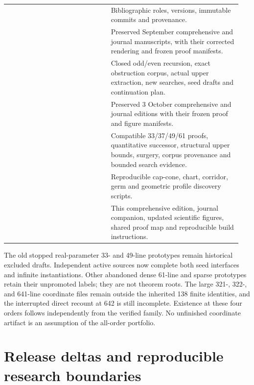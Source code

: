 \begin{longtable}{@{}P{0.42\linewidth}P{0.53\linewidth}@{}}
 & Bibliographic roles, versions, immutable commits and provenance.\\
 & Preserved September comprehensive and journal manuscripts, with their corrected rendering and frozen proof manifests.\\
 & Closed odd/even recursion, exact obstruction corpus, actual upper extraction, new searches, seed drafts and continuation plan.\\
 & Preserved 3 October comprehensive and journal editions with their frozen proof and figure manifests.\\
 & Compatible 33/37/49/61 proofs, quantitative successor, structural upper bounds, surgery, corpus provenance and bounded search evidence.\\
 & Reproducible cap-cone, chart, corridor, germ and geometric profile discovery scripts.\\
 & This comprehensive edition, journal companion, updated scientific figures, shared proof map and reproducible build instructions.\\
\end{longtable}

The old stopped real-parameter 33- and 49-line prototypes remain
historical excluded drafts. Independent active sources now complete
both seed interfaces and infinite instantiations. Other abandoned dense
61-line and sparse prototypes retain their unpromoted labels; they are
not theorem roots. The large 321-, 322-, and 641-line coordinate files
remain outside the inherited 138 finite identities, and the interrupted
direct recount at 642 is still incomplete. Existence at these four
orders follows independently from the verified family. No unfinished
coordinate artifact is an assumption of the all-order portfolio.


\section{Release deltas and reproducible research boundaries}\label{app:release-delta}

